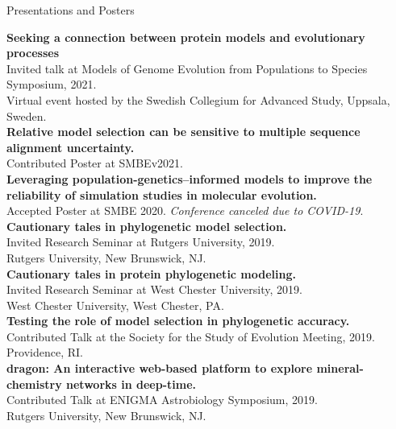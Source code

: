 \documentclass{resume} %
\begin{document}
\vspace*{0.5cm}
\begin{rSection}{Presentations and Posters}
\vspace*{0.25cm}


\textbf{Seeking a connection between protein models and evolutionary processes}
\\ Invited talk at Models of Genome Evolution from Populations to Species Symposium, 2021.
\\ Virtual event hosted by the Swedish Collegium for Advanced Study, Uppsala, Sweden. \\


\textbf{Relative model selection can be sensitive to multiple sequence alignment uncertainty.}
\\ Contributed Poster at SMBEv2021. \\


\textbf{Leveraging population-genetics--informed models to improve the reliability of simulation studies in molecular evolution.}
\\ Accepted Poster at SMBE 2020. \emph{Conference canceled due to COVID-19}. \\


\textbf{Cautionary tales in phylogenetic model selection.}
\\ Invited Research Seminar at Rutgers University, 2019.
\\ Rutgers University, New Brunswick, NJ.\\


\textbf{Cautionary tales in protein phylogenetic modeling.}
\\ Invited Research Seminar at West Chester University, 2019.
\\ West Chester University, West Chester, PA.\\


\textbf{Testing the role of model selection in phylogenetic accuracy.}
\\ Contributed Talk at the Society for the Study of Evolution Meeting, 2019.
\\ Providence, RI.\\

\textbf{dragon: An interactive web-based platform to explore mineral-chemistry networks in deep-time.}
\\ Contributed Talk at ENIGMA Astrobiology Symposium, 2019.
\\ Rutgers University, New Brunswick, NJ.\\



\end{rSection}
\end{document}
